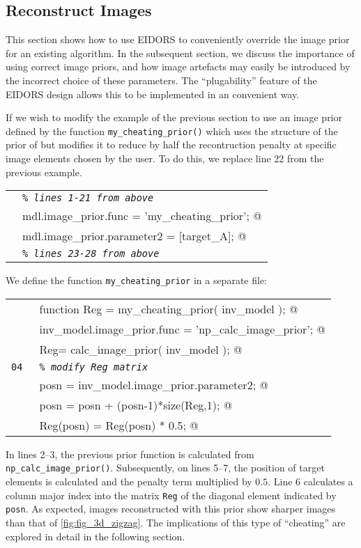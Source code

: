\documentclass[12pt]{iopart}
\makeatletter
\newcommand{\CODEstart}{\medskip\begin{tabular}{ll}}
\newcommand{\CN}{\tt\scriptsize} %
\newcommand{\CC}{&\small\verb@}   % start code
\newcommand{\CI}{&\small\tt\em}   % start code
\newcommand{\CODEend}{\end{tabular}\medskip}
\makeatother
\begin{document}
\subsection{  Reconstruct Images }

This section shows how to use EIDORS to conveniently
override the image prior
for an existing algorithm. In the subsequent section,
we discuss the importance of using correct image priors,
and how image artefacts may easily be introduced by the incorrect
choice of these parameters. The ``plugability'' feature of the
EIDORS design allows this to be implemented in an convenient way.

If we wish to modify the example of the previous section
to use an image prior defined by the function
{\tt my\_cheating\_prior()} which uses the structure of the
prior of \cite{Polydorides_2002} but modifies it to reduce
by half the recontruction penalty at specific image elements chosen by
the user. To do this, we replace line 22 from the previous
example.

\CODEstart
\CN    \CI \% lines 1-21 from above \\[-3pt]
\CN    \CC mdl.image_prior.func       = 'my_cheating_prior'; @\\[-3pt]
\CN    \CC mdl.image_prior.parameter2 = [target_A]; @\\[-3pt]
\CN    \CI \% lines 23-28 from above \\[-3pt]
\CODEend

We define the function {\tt my\_cheating\_prior} in a separate file:

\CODEstart
\CN    \CC function Reg = my_cheating_prior( inv_model ); @\\[-3pt]
\CN    \CC   inv_model.image_prior.func = 'np_calc_image_prior'; @\\[-3pt]
\CN    \CC   Reg= calc_image_prior( inv_model ); @\\[-3pt]
\CN 04 \CI   \% modify Reg matrix \\[-3pt]
\CN    \CC   posn = inv_model.image_prior.parameter2; @\\[-3pt]
\CN    \CC   posn = posn + (posn-1)*size(Reg,1); @\\[-3pt]
\CN    \CC   Reg(posn) = Reg(posn) * 0.5; @\\[-3pt]
\CODEend

In lines 2--3, the previous prior function is calculated
from {\tt np\_calc\_image\_prior()}. Subsequently, on lines
5--7, the position of target elements is calculated and
the penalty term multiplied by $0.5$. Line 6 calculates
a column major index into the matrix {\tt Reg} of the
diagonal element indicated by {\tt posn}. As expected,
images reconstructed with this prior show sharper
images than that of \ref{fig:fig_3d_zigzag}.
The implications of this type of ``cheating'' are explored
in detail in the following section.
\end{document}
